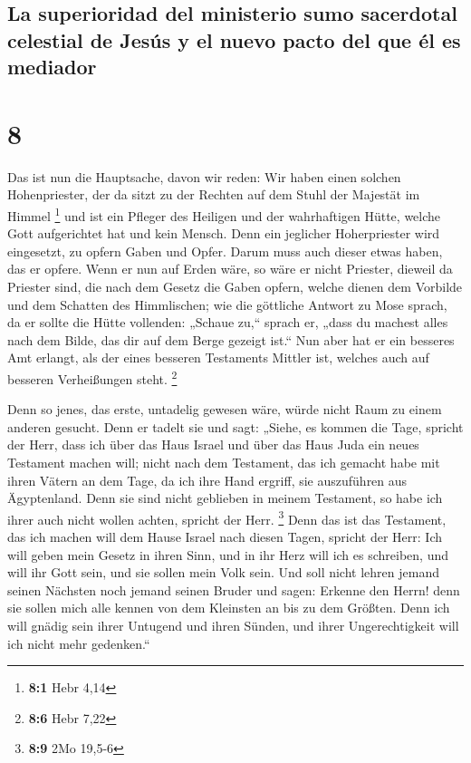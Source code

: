 \hypertarget{la-superioridad-del-ministerio-sumo-sacerdotal-celestial-de-jesuxfas-y-el-nuevo-pacto-del-que-uxe9l-es-mediador}{%
\subsection{La superioridad del ministerio sumo sacerdotal celestial de
Jesús y el nuevo pacto del que él es
mediador}\label{la-superioridad-del-ministerio-sumo-sacerdotal-celestial-de-jesuxfas-y-el-nuevo-pacto-del-que-uxe9l-es-mediador}}

\hypertarget{section-7}{%
\section{8}\label{section-7}}

 Das ist nun die Hauptsache, davon wir reden: Wir haben
einen solchen Hohenpriester, der da sitzt zu der Rechten auf dem Stuhl
der Majestät im Himmel \footnote{\textbf{8:1} Hebr 4,14} 
und ist ein Pfleger des Heiligen und der wahrhaftigen Hütte, welche Gott
aufgerichtet hat und kein Mensch.  Denn ein jeglicher
Hoherpriester wird eingesetzt, zu opfern Gaben und Opfer. Darum muss
auch dieser etwas haben, das er opfere.  Wenn er nun auf
Erden wäre, so wäre er nicht Priester, dieweil da Priester sind, die
nach dem Gesetz die Gaben opfern,  welche dienen dem
Vorbilde und dem Schatten des Himmlischen; wie die göttliche Antwort zu
Mose sprach, da er sollte die Hütte vollenden: „Schaue zu,`` sprach er,
„dass du machest alles nach dem Bilde, das dir auf dem Berge gezeigt
ist.``  Nun aber hat er ein besseres Amt erlangt, als der
eines besseren Testaments Mittler ist, welches auch auf besseren
Verheißungen steht. \footnote{\textbf{8:6} Hebr 7,22}

 Denn so jenes, das erste, untadelig gewesen wäre, würde
nicht Raum zu einem anderen gesucht.  Denn er tadelt sie
und sagt: „Siehe, es kommen die Tage, spricht der Herr, dass ich über
das Haus Israel und über das Haus Juda ein neues Testament machen will;
 nicht nach dem Testament, das ich gemacht habe mit ihren
Vätern an dem Tage, da ich ihre Hand ergriff, sie auszuführen aus
Ägyptenland. Denn sie sind nicht geblieben in meinem Testament, so habe
ich ihrer auch nicht wollen achten, spricht der Herr. \footnote{\textbf{8:9}
  2Mo 19,5-6}  Denn das ist das Testament, das ich machen
will dem Hause Israel nach diesen Tagen, spricht der Herr: Ich will
geben mein Gesetz in ihren Sinn, und in ihr Herz will ich es schreiben,
und will ihr Gott sein, und sie sollen mein Volk sein. 
Und soll nicht lehren jemand seinen Nächsten noch jemand seinen Bruder
und sagen: Erkenne den Herrn! denn sie sollen mich alle kennen von dem
Kleinsten an bis zu dem Größten.  Denn ich will gnädig
sein ihrer Untugend und ihren Sünden, und ihrer Ungerechtigkeit will ich
nicht mehr gedenken.``

